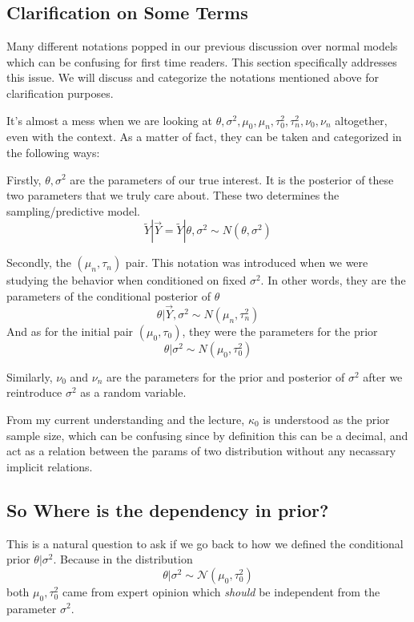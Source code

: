 \subsection{Clarification on Some Terms}
Many different notations popped in our previous discussion over normal models which can be confusing for first time readers. This section specifically addresses this issue. We will discuss and categorize the notations mentioned above for clarification purposes. 

It's almost a mess when we are looking at $\theta, \sigma^2, \mu_0, \mu_n, \tau_0^2, \tau_n^2, \nu_0, \nu_n$ altogether, even with the context. As a matter of fact, they can be taken and categorized in the following ways:

Firstly, $\theta, \sigma^2$ are the parameters of our true interest. It is the posterior of these two parameters that we truly care about. These two determines the sampling/predictive model. 
\begin{equation*}
    \tilde{Y} | \vec{Y} = \tilde{Y} | \theta, \sigma^2 \sim N(\theta, \sigma^2)
\end{equation*}

Secondly, the $(\mu_n, \tau_n)$ pair. This notation was introduced when we were studying the behavior when conditioned on fixed $\sigma^2$. In other words, they are the parameters of the conditional posterior of $\theta$
\begin{equation*}
    \theta | \vec{Y}, \sigma^2 \sim N(\mu_n, \tau_n^2)
\end{equation*}
And as for the initial pair $(\mu_0, \tau_0)$, they were the parameters for the prior
\begin{equation*}
    \theta | \sigma^2 \sim N(\mu_0, \tau_0^2)
\end{equation*}

Similarly, $\nu_0$ and $\nu_n$ are the parameters for the prior and posterior of $\sigma^2$ after we reintroduce $\sigma^2$ as a random variable. 

From my current understanding and the lecture, $\kappa_0$ is understood as the prior sample size, which can be confusing since by definition this can be a decimal, and act as a relation between the params of two distribution without any necassary implicit relations.

\subsection*{So Where is the dependency in prior?}
This is a natural question to ask if we go back to how we defined the conditional prior $\theta | \sigma^2$. Because in the distribution
\begin{equation*}
    \theta | \sigma^2 \sim \mathcal{N}(\mu_0, \tau_0^2)
\end{equation*}
both $\mu_0, \tau_0^2$ came from expert opinion which \emph{should} be independent from the parameter $\sigma^2$. 

